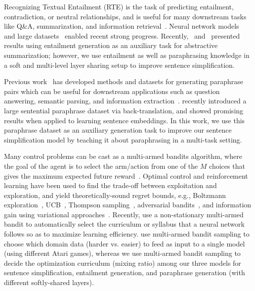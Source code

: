 \documentclass[11pt]{article}
\begin{document}
Recognizing Textual Entailment (RTE) is the task of predicting entailment, contradiction, or neutral relationships, and is useful for many downstream tasks like Q\&A, summarization, and information retrieval~\cite{harabagiu2006methods,dagan2006pascal,lai2014illinois,jimenez2014unal}. Neural network models~\cite{bowman2016snli,parikh2016decomposable} and large datasets~\cite{bowman2016snli,williams2017broad} enabled recent strong progress. Recently,~ and~ presented results using entailment generation as an auxiliary task for abstractive summarization; however, we use entailment as well as paraphrasing knowledge in a soft and multi-level layer sharing setup to improve sentence simplification.

Previous work~\cite{barzilay2001extracting,ganitkevitch2013ppdb,Wieting2017PushingTL} has developed methods and datasets for generating paraphrase pairs which can be useful for downstream applications such as question answering, semantic parsing, and information extraction~\cite{fader2013paraphrase,berant2014semantic,zhang2015exploiting}.  recently introduced a large sentential paraphrase dataset via back-translation, and showed promising results when applied to learning sentence embeddings. In this work, we use this paraphrase dataset as an auxiliary generation task to improve our sentence simplification model by teaching it about paraphrasing in a multi-task setting.

Many control problems can be cast as a multi-armed bandits algorithm, where the goal of the agent is to select the arm/action from one of the $M$ choices that gives the maximum expected future reward~\cite{bubeck2012regret}. Optimal control and reinforcement learning have been used to find the trade-off between exploitation and exploration, and yield theoretically-sound regret bounds, e.g., Boltzmann exploration~\cite{kaelbling1996reinforcement}, UCB~\cite{auer2002finite}, Thompson sampling~\cite{chapelle2011empirical}, adversarial bandits~\cite{auer2002nonstochastic}, and information gain using variational approaches~\cite{houthooft2016vime}. Recently,  use a non-stationary multi-armed bandit to automatically select the curriculum or syllabus that a neural network follows so as to maximize learning efficiency.  use multi-armed bandit sampling to choose which domain data (harder vs. easier) to feed as input to a single model (using different Atari games), whereas we use multi-armed bandit sampling to decide the optimization curriculum (mixing ratio) among our three models for sentence simplification, entailment generation, and paraphrase generation (with different softly-shared layers).
\end{document}
